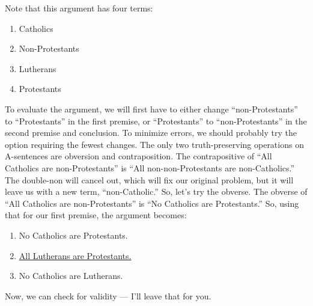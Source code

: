 Note that this argument has four terms:

\begin{enumerate}

\item Catholics
\item Non-Protestants
\item Lutherans
\item Protestants

\end{enumerate}

To evaluate the argument, we will first have to either change \enquote{non-Protestants} to \enquote{Protestants} in the first premise, or \enquote{Protestants} to \enquote{non-Protestants} in the second premise and conclusion. To minimize errors, we should probably try the option requiring the fewest changes. The only two truth-preserving operations on A-sentences are obversion and contraposition. The contrapositive of \enquote{All Catholics are non-Protestants} is \enquote{All non-non-Protestants are non-Catholics.} The double-non will cancel out, which will fix our original problem, but it will leave us with a new term, \enquote{non-Catholic.} So, let's try the obverse. The obverse of \enquote{All Catholics are non-Protestants} is \enquote{No Catholics are Protestants.} So, using that for our first premise, the argument becomes:

\begin{enumerate}
\item No Catholics are Protestants.
\item \underline{All Lutherans are Protestants.}
\item No Catholics are Lutherans.
\end{enumerate}

Now, we can check for validity — I'll leave that for you.



